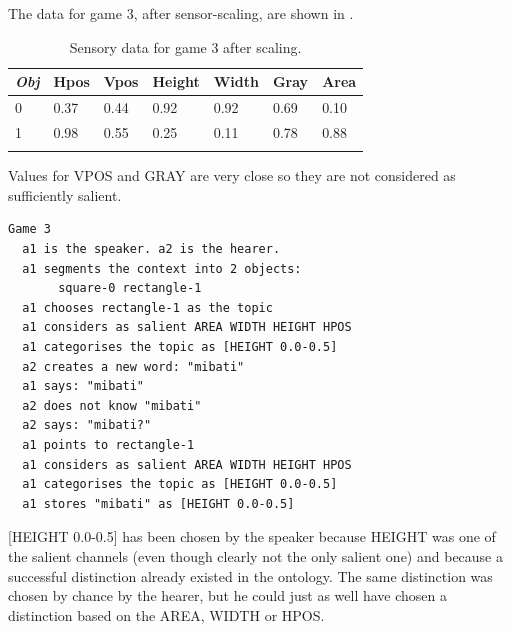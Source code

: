 The data for game 3, after sensor-scaling,
are shown in . 
\begin{table}
\begin{center}
\begin{tabular}{ l  l  l  l  l  l  l }
\lsptoprule
{\itshape Obj} & Hpos & Vpos & Height & Width & Gray & Area \\ \midrule
0 & 0.37 & 0.44 & 0.92 & 0.92 & 0.69 & 0.10\\ 
1 & 0.98 & 0.55 & 0.25 & 0.11 & 0.78 & 0.88\\ 
\lspbottomrule
\end{tabular}
\caption{\label{tab:game3} Sensory data for game 3 after scaling.}
\end{center}
\end{table}
Values for VPOS and GRAY are very close so they are not 
considered as sufficiently salient.
\begin{verbatim}
Game 3
  a1 is the speaker. a2 is the hearer. 
  a1 segments the context into 2 objects: 
       square-0 rectangle-1 
  a1 chooses rectangle-1 as the topic 
  a1 considers as salient AREA WIDTH HEIGHT HPOS 
  a1 categorises the topic as [HEIGHT 0.0-0.5]
  a2 creates a new word: "mibati"
  a1 says: "mibati"
  a2 does not know "mibati"
  a2 says: "mibati?"
  a1 points to rectangle-1
  a1 considers as salient AREA WIDTH HEIGHT HPOS 
  a1 categorises the topic as [HEIGHT 0.0-0.5]
  a1 stores "mibati" as [HEIGHT 0.0-0.5]
\end{verbatim}
{}[HEIGHT 0.0-0.5] has been chosen by the speaker
because HEIGHT was one of the salient channels (even 
though clearly not the only salient one) and 
because a successful distinction already existed in 
the ontology. The same 
distinction was chosen by chance by the hearer, but he 
could just as well have chosen a distinction based on 
the AREA, WIDTH or HPOS. 

